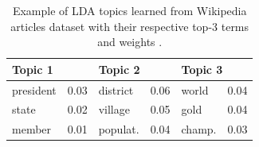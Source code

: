 \documentclass[10pt, a4paper, twocolumn]{article} %
\begin{document}
\begin{table}[H]
	\centering
	
  \begin{tabular}{llllll}
	\toprule
    \multicolumn{2}{l}{Topic 1} &
    \multicolumn{2}{l}{Topic 2} &
    \multicolumn{2}{l}{Topic 3} \\
    \midrule
    president & 0.03 & district & 0.06 & world & 0.04 \\
    state & 0.02 & village & 0.05 & gold & 0.04 \\
    member & 0.01 & populat. & 0.04 & champ. & 0.03 \\
    \bottomrule
  \end{tabular}
	
	
	

	\caption{Example of LDA topics learned from Wikipedia articles dataset  with their respective top-3 terms and weights \cite{lda}.}
	\label{table:lda}
\end{table}
\end{document}
